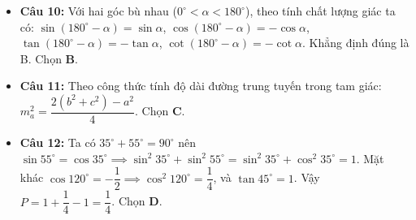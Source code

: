 \documentclass[12pt,a4paper]{article}
\begin{document}
\begin{itemize}[leftmargin=0.6cm, itemsep=1.5pt, topsep=1pt]
    Nửa chu vi tam giác: $p = \dfrac{6 + 8 + 10}{2} = 12$.
    Diện tích tam giác: $S = \dfrac{1}{2}AB \cdot AC = \dfrac{1}{2} \cdot 6 \cdot 8 = 24$.
    Bán kính đường tròn nội tiếp: $r = \dfrac{S}{p} = \dfrac{24}{12} = 2$. Chọn \textbf{A}.
    \item \textbf{Câu 10:} Với hai góc bù nhau ($0^\circ < \alpha < 180^\circ$), theo tính chất lượng giác ta có: $\sin(180^\circ - \alpha) = \sin \alpha$, $\cos(180^\circ - \alpha) = -\cos \alpha$, $\tan(180^\circ - \alpha) = -\tan \alpha$, $\cot(180^\circ - \alpha) = -\cot \alpha$. Khẳng định đúng là B. Chọn \textbf{B}.
    \item \textbf{Câu 11:} Theo công thức tính độ dài đường trung tuyến trong tam giác: $m_a^2 = \dfrac{2(b^2 + c^2) - a^2}{4}$. Chọn \textbf{C}.
    \item \textbf{Câu 12:} Ta có $35^\circ + 55^\circ = 90^\circ$ nên $\sin 55^\circ = \cos 35^\circ \implies \sin^2 35^\circ + \sin^2 55^\circ = \sin^2 35^\circ + \cos^2 35^\circ = 1$.
    Mặt khác $\cos 120^\circ = -\dfrac{1}{2} \implies \cos^2 120^\circ = \dfrac{1}{4}$, và $\tan 45^\circ = 1$.
    Vậy $P = 1 + \dfrac{1}{4} - 1 = \dfrac{1}{4}$. Chọn \textbf{D}.
\end{itemize}
\end{document}
